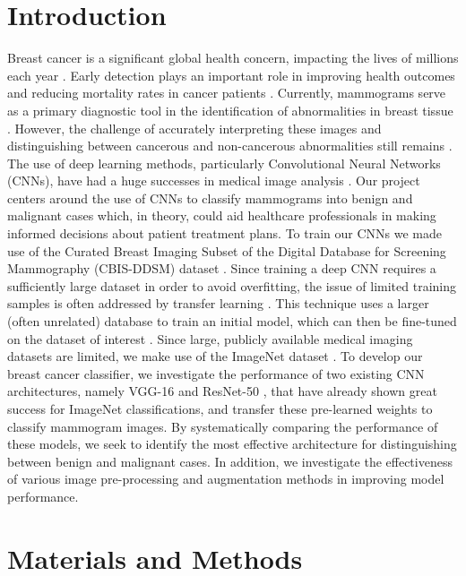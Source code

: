 \documentclass[sn-mathphys,Numbered]{sn-jnl}%
\theoremstyle{thmstyleone}%
\theoremstyle{thmstyletwo}%
\theoremstyle{thmstylethree}%
\begin{document}
\section{Introduction}\label{Introduction}
Breast cancer is a significant global health concern, impacting the lives of millions each year \cite{siegel2023cancer}. Early detection plays an important role in improving health outcomes and reducing mortality rates in cancer patients \cite{Mathew2018}. Currently, mammograms serve as a primary diagnostic tool in the identification of abnormalities in breast tissue \cite{Mathew2018}. However, the challenge of accurately interpreting these images and distinguishing between cancerous and non-cancerous abnormalities still remains \cite{elter2009}. The use of deep learning methods, particularly Convolutional Neural Networks (CNNs), have had a huge successes in medical image analysis \cite{Cai2020-hn}. Our project centers around the use of CNNs to classify mammograms into benign and malignant cases which, in theory, could aid healthcare professionals in making informed decisions about patient treatment plans. To train our CNNs we made use of the Curated Breast Imaging Subset of the Digital Database for Screening Mammography (CBIS-DDSM) dataset \cite{Lee2017-hi}. Since training a deep CNN requires a sufficiently large dataset in order to avoid overfitting, the issue of limited training samples is often addressed by transfer learning \cite{Kim2022-ge}. This technique uses a larger (often unrelated) database to train an initial model, which can then be fine-tuned on the dataset of interest \cite{Kim2022-ge}. Since large, publicly available medical imaging datasets are limited, we make use of the ImageNet dataset \cite{Deng2009-vj}. To develop our breast cancer classifier, we investigate the performance of two existing CNN architectures, namely VGG-16 \cite{simonyan2015deep} and ResNet-50 \cite{he2015deep}, that have already shown great success for ImageNet classifications, and transfer these pre-learned weights to classify mammogram images. By systematically comparing the performance of these models, we seek to identify the most effective architecture for distinguishing between benign and malignant cases. In addition, we investigate the effectiveness of various image pre-processing and augmentation methods in improving model performance.

\section{Materials and Methods}\label{Materials}
\end{document}
